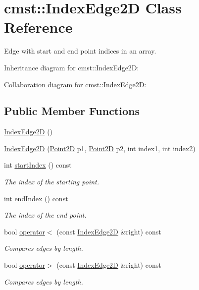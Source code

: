 \hypertarget{classcmst_1_1_index_edge2_d}{}\section{cmst::IndexEdge2D Class Reference}
\label{classcmst_1_1_index_edge2_d}


Edge with start and end point indices in an array.  




Inheritance diagram for cmst::IndexEdge2D:


Collaboration diagram for cmst::IndexEdge2D:
\subsection*{Public Member Functions}
\begin{DoxyCompactItemize}
\item 
\hyperlink{classcmst_1_1_index_edge2_d_aace5c7209f868577cb353f309d4427fb}{IndexEdge2D} ()
\item 
\hyperlink{classcmst_1_1_index_edge2_d_aa01ca9e529a319fffb5f500ab7218ef6}{IndexEdge2D} (\hyperlink{classcmst_1_1_point2_d}{Point2D} p1, \hyperlink{classcmst_1_1_point2_d}{Point2D} p2, int index1, int index2)
\item 
int \hyperlink{classcmst_1_1_index_edge2_d_ab92c0b814ea9c354a71acfc84c871f72}{startIndex} () const 
\begin{DoxyCompactList}\small\item\em The index of the starting point. \end{DoxyCompactList}\item 
int \hyperlink{classcmst_1_1_index_edge2_d_ad50c559d38e5857c03be255774deff12}{endIndex} () const 
\begin{DoxyCompactList}\small\item\em The index of the end point. \end{DoxyCompactList}\item 
bool \hyperlink{classcmst_1_1_index_edge2_d_a96fc8ab0bb52c8c3aa8d5eed3a0034dd}{operator$<$} (const \hyperlink{classcmst_1_1_index_edge2_d}{IndexEdge2D} \&right) const 
\begin{DoxyCompactList}\small\item\em Compares edges by length. \end{DoxyCompactList}\item 
bool \hyperlink{classcmst_1_1_index_edge2_d_a9b0f6b17a930986f99d30e03c34905c8}{operator$>$} (const \hyperlink{classcmst_1_1_index_edge2_d}{IndexEdge2D} \&right) const 
\begin{DoxyCompactList}\small\item\em Compares edges by length. \end{DoxyCompactList}\end{DoxyCompactItemize}
